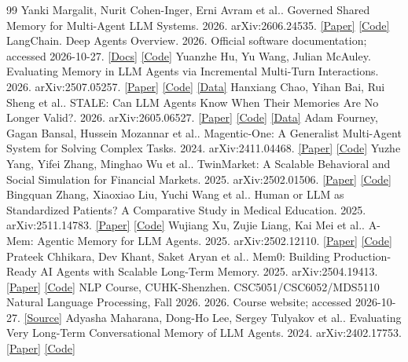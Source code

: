 \documentclass[a4paper,11pt]{article}
\begin{document}
\begin{thebibliography}{99}
Yanki Margalit, Nurit Cohen-Inger, Erni Avram et al.. Governed Shared Memory for Multi-Agent LLM Systems. 2026. arXiv:2606.24535. \href{https://arxiv.org/abs/2606.24535}{[Paper]} \href{https://github.com/caura-ai/caura}{[Code]}
LangChain. Deep Agents Overview. 2026. Official software documentation; accessed 2026-10-27. \href{https://docs.langchain.com/oss/python/deepagents/overview}{[Docs]} \href{https://github.com/langchain-ai/deepagents}{[Code]}
Yuanzhe Hu, Yu Wang, Julian McAuley. Evaluating Memory in LLM Agents via Incremental Multi-Turn Interactions. 2026. arXiv:2507.05257. \href{https://arxiv.org/abs/2507.05257}{[Paper]} \href{https://github.com/HUST-AI-HYZ/MemoryAgentBench}{[Code]} \href{https://huggingface.co/datasets/ai-hyz/MemoryAgentBench}{[Data]}
Hanxiang Chao, Yihan Bai, Rui Sheng et al.. STALE: Can LLM Agents Know When Their Memories Are No Longer Valid?. 2026. arXiv:2605.06527. \href{https://arxiv.org/abs/2605.06527}{[Paper]} \href{https://github.com/icedreamc/STALE}{[Code]} \href{https://huggingface.co/datasets/STALEproj/STALE}{[Data]}
Adam Fourney, Gagan Bansal, Hussein Mozannar et al.. Magentic-One: A Generalist Multi-Agent System for Solving Complex Tasks. 2024. arXiv:2411.04468. \href{https://arxiv.org/abs/2411.04468}{[Paper]} \href{https://github.com/microsoft/autogen}{[Code]}
Yuzhe Yang, Yifei Zhang, Minghao Wu et al.. TwinMarket: A Scalable Behavioral and Social Simulation for Financial Markets. 2025. arXiv:2502.01506. \href{https://arxiv.org/abs/2502.01506}{[Paper]} \href{https://github.com/FreedomIntelligence/TwinMarket}{[Code]}
Bingquan Zhang, Xiaoxiao Liu, Yuchi Wang et al.. Human or LLM as Standardized Patients? A Comparative Study in Medical Education. 2025. arXiv:2511.14783. \href{https://arxiv.org/abs/2511.14783}{[Paper]} \href{https://github.com/FreedomIntelligence/EasyMED}{[Code]}
Wujiang Xu, Zujie Liang, Kai Mei et al.. A-Mem: Agentic Memory for LLM Agents. 2025. arXiv:2502.12110. \href{https://arxiv.org/abs/2502.12110}{[Paper]} \href{https://github.com/agiresearch/A-mem}{[Code]}
Prateek Chhikara, Dev Khant, Saket Aryan et al.. Mem0: Building Production-Ready AI Agents with Scalable Long-Term Memory. 2025. arXiv:2504.19413. \href{https://arxiv.org/abs/2504.19413}{[Paper]} \href{https://github.com/mem0ai/mem0}{[Code]}
NLP Course, CUHK-Shenzhen. CSC5051/CSC6052/MDS5110 Natural Language Processing, Fall 2026. 2026. Course website; accessed 2026-10-27. \href{https://nlp-course-cuhksz.github.io/}{[Source]}
Adyasha Maharana, Dong-Ho Lee, Sergey Tulyakov et al.. Evaluating Very Long-Term Conversational Memory of LLM Agents. 2024. arXiv:2402.17753. \href{https://arxiv.org/abs/2402.17753}{[Paper]} \href{https://github.com/snap-research/locomo}{[Code]}
\end{thebibliography}
\end{document}

